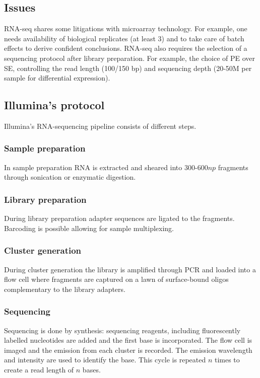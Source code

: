 	\subsection{Issues}
	RNA-seq shares some litigations with microarray technology.
	For example, one needs availability of biological replicates (at least $3$) and to take care of batch effects to derive confident conclusions.
	RNA-seq also requires the selection of a sequencing protocol after library preparation.
	For example, the choice of PE over SE, controlling the read length (100/150 bp) and sequencing depth (20-50M per sample for differential expression).

	\subsection{Illumina's protocol}
	Illumina's RNA-sequencing pipeline consists of different steps.

		\subsubsection{Sample preparation}
		In sample preparation RNA is extracted and sheared into $300$-$600np$ fragments through sonication or enzymatic digestion.

		\subsubsection{Library preparation}
		During library preparation adapter sequences are ligated to the fragments.
		Barcoding is possible allowing for sample multiplexing.

		\subsubsection{Cluster generation}
		During cluster generation the library is amplified through PCR and loaded into a flow cell where fragments are captured on a lawn of surface-bound oligos complementary to the library adapters.

		\subsubsection{Sequencing}
		Sequencing is done by synthesis: sequencing reagents, including fluorescently labelled nucleotides are added and the first base is incorporated.
		The flow cell is imaged and the emission from each cluster is recorded.
		The emission wavelength and intensity are used to identify the base.
		This cycle is repeated $n$ times to create a read length of $n$ bases.

